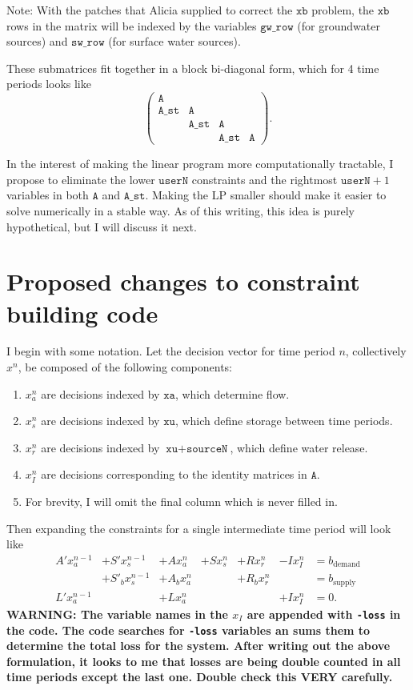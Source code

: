\documentclass[11pt]{article}
\newcommand{\A}{\texttt{A}}
\newcommand{\Ast}{\texttt{A\_st}}
\newcommand{\xb}{\texttt{xb}}
\newcommand{\xa}{\texttt{xa}}
\newcommand{\xu}{\texttt{xu}}
\newcommand{\sourceN}{\texttt{sourceN}}
\newcommand{\userN}{\texttt{userN}}
\newcommand{\sw}{\texttt{sw\_row}}
\newcommand{\gw}{\texttt{gw\_row}}
\begin{document}
Note: With the patches that Alicia supplied to correct the $\xb$ problem, the $\xb$ rows in the matrix will be indexed by the variables $\gw$ (for groundwater sources) and $\sw$ (for surface water sources).

These submatrices fit together in a block bi-diagonal form, which for 4 time periods looks like
\[
	\left(
	\begin{array}{cccc}
		\A   &      &      &    \\
		\Ast & \A   &      &    \\
		     & \Ast & \A   &    \\
		     &      & \Ast & \A 
	\end{array}
	\right).
\]

In the interest of making the linear program more computationally tractable, I propose to eliminate the lower $\userN$ constraints and the rightmost $\userN+1$ variables in both $\A$ and $\Ast$.
Making the LP smaller should make it easier to solve numerically in a stable way.
As of this writing, this idea is purely hypothetical, but I will discuss it next.

\pagebreak

\section*{Proposed changes to constraint building code}

I begin with some notation.
Let the decision vector for time period $n$, collectively $x^n$, be composed of the following components:
\begin{enumerate}
	\item $x^n_a$ are decisions indexed by $\xa$, which determine flow.
	\item $x^n_s$ are decisions indexed by $\xu$, which define storage between time periods.
	\item $x^n_r$ are decisions indexed by $\xu+\sourceN$, which define water release.
	\item $x^n_I$ are decisions corresponding to the identity matrices in $\A$.
	\item For brevity, I will omit the final column which is never filled in.
\end{enumerate}

Then expanding the constraints for a single intermediate time period will look like
\[
	\begin{array}{rrrrrrl}
		A' x^{n-1}_a & + S' x^{n-1}_s   & + A x^n_a   & + S x^n_s & + R x^n_r   & - Ix^n_I  & = b_\text{demand} \\
		             & + S'_b x^{n-1}_s & + A_b x^n_a &           & + R_b x^n_r &           & = b_\text{supply} \\
		L' x^{n-1}_a &                  & + L x^n_a   &           &             & + I x^n_I & = 0.
	\end{array}
\]
\textbf{
	WARNING: The variable names in the $x_I$ are appended with \texttt{-loss} in the code.
	The code searches for \texttt{-loss} variables an sums them to determine the total loss for the system.
	After writing out the above formulation, it looks to me that losses are being double counted in all time periods except the last one.
	Double check this VERY carefully.
}
\end{document}
